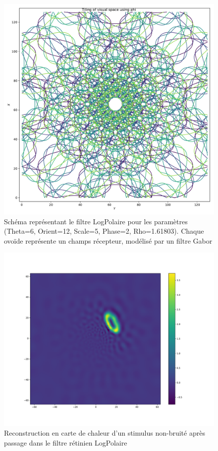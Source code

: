 \begin{figure}[th]
\centering
\includegraphics[scale=0.4]{Figures/logpol_filter}
\decoRule
\caption[Figure]{Schéma représentant le filtre LogPolaire pour les paramètres (Theta=6, Orient=12, Scale=5, Phase=2, Rho=1.61803). Chaque ovoïde représente un champs récepteur, modélisé par un filtre Gabor \autocite{Freeman2011}}
\label{fig:logpol_filter}
\end{figure}

\begin{figure}[th]
\centering
\includegraphics[scale=0.4]{Figures/mnist_128_LP_nonoise}
\decoRule
\caption[Figure]{Reconstruction en carte de chaleur d'un stimulus non-bruité après passage dans le filtre rétinien LogPolaire}
\label{fig:mnist_128_LP_nonoise}
\end{figure}

